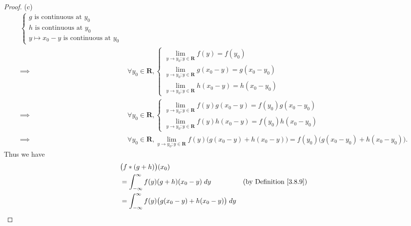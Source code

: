 \begin{proof}{(c)}
\begin{align*}
\begin{cases}
                                                   g \text{ is continuous at } y_0 \\
                                                   h \text{ is continuous at } y_0 \\
                                                   y \mapsto x_0 - y \text{ is continuous at } y_0
                                               \end{cases}                                                                             \\
        \implies & \forall y_0 \in \mathbf{R}, \begin{cases}
                                                   \lim_{y \to y_0 ; y \in \mathbf{R}} f(y) = f(y_0)             \\
                                                   \lim_{y \to y_0 ; y \in \mathbf{R}} g(x_0 - y) = g(x_0 - y_0) \\
                                                   \lim_{y \to y_0 ; y \in \mathbf{R}} h(x_0 - y) = h(x_0 - y_0)
                                               \end{cases}                                                 \\
        \implies & \forall y_0 \in \mathbf{R}, \begin{cases}
                                                   \lim_{y \to y_0 ; y \in \mathbf{R}} f(y) g(x_0 - y) = f(y_0) g(x_0 - y_0) \\
                                                   \lim_{y \to y_0 ; y \in \mathbf{R}} f(y) h(x_0 - y) = f(y_0) h(x_0 - y_0)
                                               \end{cases}                                     \\
        \implies & \forall y_0 \in \mathbf{R}, \lim_{y \to y_0 ; y \in \mathbf{R}} f(y) \big(g(x_0 - y) + h(x_0 - y)\big) = f(y_0) \big(g(x_0 - y_0) + h(x_0 - y_0)\big).
    \end{align*}
    Thus we have
    \begin{align*}
         & \big(f * (g + h)\big)(x_0)                                                                                                                    \\
         & = \int_{-\infty}^\infty f(y) (g + h)(x_0 - y) \; dy                                                      & \text{(by Definition \ref{3.8.9})} \\
         & = \int_{-\infty}^\infty f(y) \big(g(x_0 - y) + h(x_0 - y)\big) \; dy                                                                          \\

\end{align*}
\end{proof}
